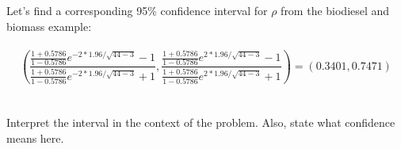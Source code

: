 Let's find a corresponding 95\% confidence interval for $\rho$ from the biodiesel and biomass example: \\~\\
$$\left(\frac{\frac{1+0.5786}{1-0.5786}e^{-2*1.96/\sqrt{44-3}}-1}{\frac{1+0.5786}{1-0.5786}e^{-2*1.96/\sqrt{44-3}}+1}, \frac{\frac{1+0.5786}{1-0.5786}e^{2*1.96/\sqrt{44-3}}-1}{\frac{1+0.5786}{1-0.5786}e^{2*1.96/\sqrt{44-3}}+1}\right) = (0.3401, 0.7471)$$~\\~\\
Interpret the interval in the context of the problem.  Also, state what confidence means here.

\newpage

